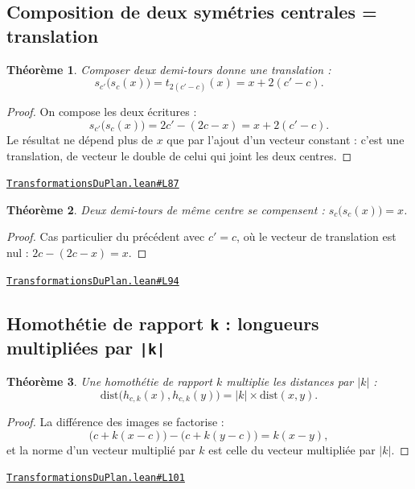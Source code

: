 \documentclass[11pt,a4paper]{article}
\theoremstyle{definition}
\theoremstyle{plain}
\newtheorem{theoreme}{Théorème}
\newcommand{\source}[2]{\par\smallskip\noindent\hfill{\footnotesize\href{#1}{\texttt{#2}}}\par\smallskip}
\begin{document}
\subsection{Composition de deux symétries centrales = translation}

\begin{theoreme}
Composer deux demi-tours donne une translation :
\[ s_{c'}\bigl(s_c(x)\bigr) = t_{2(c' - c)}(x) = x + 2(c' - c) . \]
\end{theoreme}

\begin{proof}
On compose les deux écritures :
\[ s_{c'}\bigl(s_c(x)\bigr) = 2c' - (2c - x) = x + 2(c' - c) . \]
Le résultat ne dépend plus de $x$ que par l'ajout d'un vecteur constant : c'est une
translation, de vecteur le double de celui qui joint les deux centres.
\end{proof}
\source{https://github.com/Commutator-IO/learn-lean/blob/main/cours/01-college/03-transformations-du-plan/TransformationsDuPlan.lean\#L87}{TransformationsDuPlan.lean\#L87}

\begin{theoreme}
Deux demi-tours de même centre se compensent : $s_c\bigl(s_c(x)\bigr) = x$.
\end{theoreme}

\begin{proof}
Cas particulier du précédent avec $c' = c$, où le vecteur de translation est nul :
$2c - (2c - x) = x$.
\end{proof}
\source{https://github.com/Commutator-IO/learn-lean/blob/main/cours/01-college/03-transformations-du-plan/TransformationsDuPlan.lean\#L94}{TransformationsDuPlan.lean\#L94}

\subsection{Homothétie de rapport \texttt{k} : longueurs multipliées par \texttt{|k|}}

\begin{theoreme}
Une homothétie de rapport $k$ multiplie les distances par $|k|$ :
\[ \mathrm{dist}\bigl(h_{c,k}(x), h_{c,k}(y)\bigr) = |k| \times \mathrm{dist}(x, y) . \]
\end{theoreme}

\begin{proof}
La différence des images se factorise :
\[ \bigl(c + k(x - c)\bigr) - \bigl(c + k(y - c)\bigr) = k(x - y) , \]
et la norme d'un vecteur multiplié par $k$ est celle du vecteur multipliée par $|k|$.
\end{proof}
\source{https://github.com/Commutator-IO/learn-lean/blob/main/cours/01-college/03-transformations-du-plan/TransformationsDuPlan.lean\#L101}{TransformationsDuPlan.lean\#L101}
\end{document}
